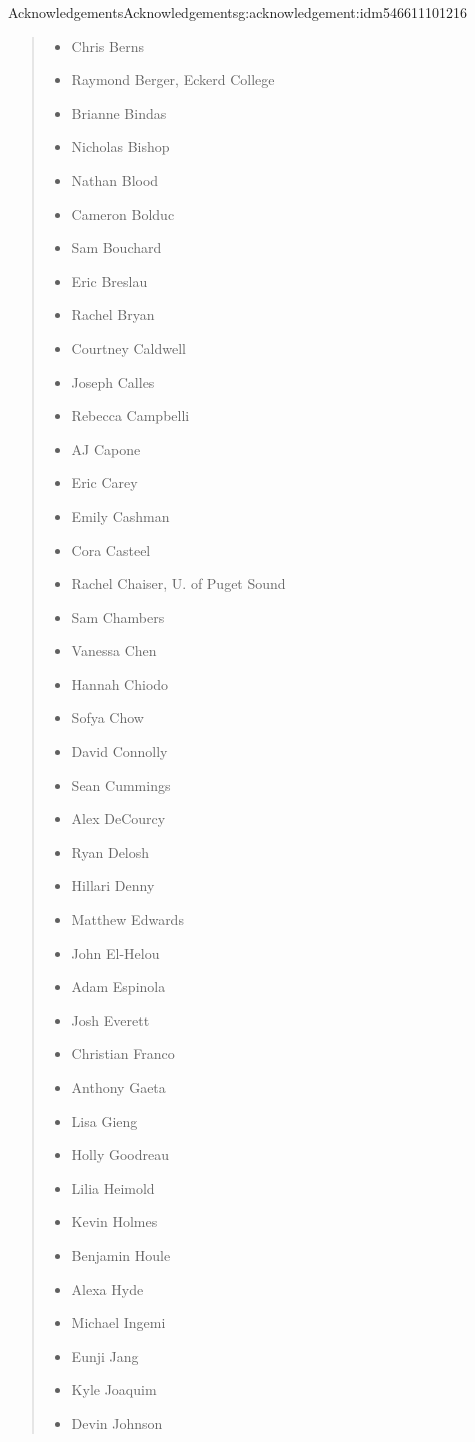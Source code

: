 \documentclass[oneside,10pt,]{book}
\numberwithin{equation}{section}
\begin{document}
\begin{acknowledgement}{Acknowledgements}{}{Acknowledgements}{}{}{g:acknowledgement:idm546611101216}
\begin{quote}
\begin{multicols}{2}
\begin{itemize}[label=\textbullet]
\item{}Chris Berns%
\item{}Raymond Berger, Eckerd College%
\item{}Brianne Bindas%
\item{}Nicholas Bishop%
\item{}Nathan Blood%
\item{}Cameron Bolduc%
\item{}Sam Bouchard%
\item{}Eric Breslau%
\item{}Rachel Bryan%
\item{}Courtney Caldwell%
\item{}Joseph Calles%
\item{}Rebecca Campbelli%
\item{}AJ Capone%
\item{}Eric Carey%
\item{}Emily Cashman%
\item{}Cora Casteel%
\item{}Rachel Chaiser, U. of Puget Sound%
\item{}Sam Chambers%
\item{}Vanessa Chen%
\item{}Hannah Chiodo%
\item{}Sofya Chow%
\item{}David Connolly%
\item{}Sean Cummings%
\item{}Alex DeCourcy%
\item{}Ryan Delosh%
\item{}Hillari Denny%
\item{}Matthew Edwards%
\item{}John El-Helou%
\item{}Adam Espinola%
\item{}Josh Everett%
\item{}Christian Franco%
\item{}Anthony Gaeta%
\item{}Lisa Gieng%
\item{}Holly Goodreau%
\item{}Lilia Heimold%
\item{}Kevin Holmes%
\item{}Benjamin Houle%
\item{}Alexa Hyde%
\item{}Michael Ingemi%
\item{}Eunji Jang%
\item{}Kyle Joaquim%
\item{}Devin Johnson%

\end{itemize}
\end{multicols}
\end{quote}
\end{acknowledgement}
\end{document}
